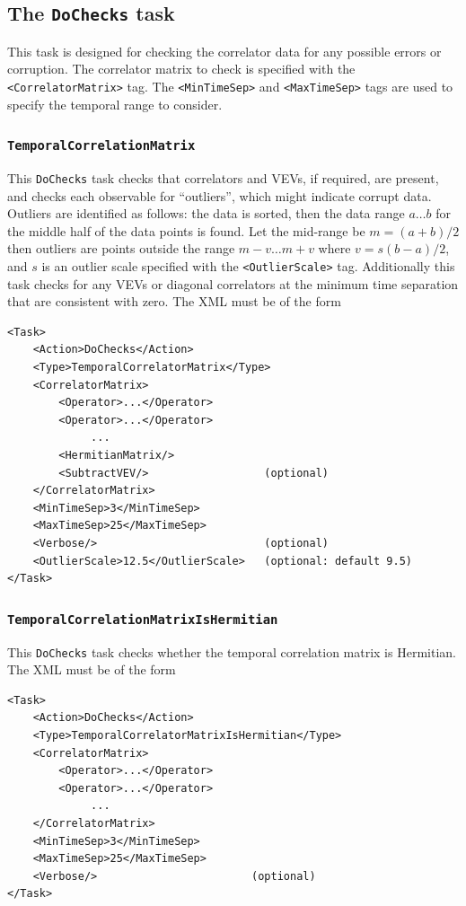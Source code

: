 \documentclass[12pt]{article}
\newcommand{\vb}{\texttt}
\begin{document}
\subsection{The \vb{DoChecks} task}

This task is designed for checking the correlator data for any possible errors
or corruption.
The correlator matrix to check is specified with the \vb{<CorrelatorMatrix>} tag.
The \vb{<MinTimeSep>} and \vb{<MaxTimeSep>} tags are used to specify the temporal
range to consider.

\subsubsection{\vb{TemporalCorrelationMatrix}}
This \vb{DoChecks} task checks that correlators and VEVs, if required, are present,
and checks each observable for ``outliers'', which might indicate corrupt data.
Outliers are identified as follows: the data is sorted, then the data range $a\dots b$
for the middle half of the data points is found.
Let the mid-range be $m=(a+b)/2$ then outliers are points outside the range
$m-v \dots m+v$  where $v = s (b-a)/2$, and $s$ is an outlier scale 
specified with the \vb{<OutlierScale>} tag.
Additionally this task checks for any VEVs or diagonal correlators
at the minimum time separation that are consistent with zero.
The XML must be of the form
\begin{verbatim}
<Task>
    <Action>DoChecks</Action>
    <Type>TemporalCorrelatorMatrix</Type>
    <CorrelatorMatrix>
        <Operator>...</Operator>
        <Operator>...</Operator>
             ...
        <HermitianMatrix/>
        <SubtractVEV/>                  (optional)
    </CorrelatorMatrix>
    <MinTimeSep>3</MinTimeSep>
    <MaxTimeSep>25</MaxTimeSep>
    <Verbose/>                          (optional)
    <OutlierScale>12.5</OutlierScale>   (optional: default 9.5)
</Task>
\end{verbatim}

\subsubsection{\vb{TemporalCorrelationMatrixIsHermitian}}
This \vb{DoChecks} task checks whether the temporal correlation matrix is Hermitian.
The XML must be of the form
\begin{verbatim}
<Task>
    <Action>DoChecks</Action>
    <Type>TemporalCorrelatorMatrixIsHermitian</Type>
    <CorrelatorMatrix>
        <Operator>...</Operator>
        <Operator>...</Operator>
             ...
    </CorrelatorMatrix>
    <MinTimeSep>3</MinTimeSep>
    <MaxTimeSep>25</MaxTimeSep>
    <Verbose/>                        (optional)
</Task>
\end{verbatim}
\end{document}
